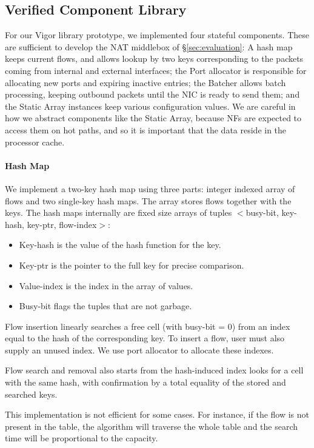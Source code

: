 \documentclass[letterpaper,twocolumn,10pt]{article}
\begin{document}
\subsection{Verified Component Library}

For our Vigor library prototype, we implemented four stateful components. These
are sufficient to develop the NAT middlebox of \S\ref{sec:evaluation}: A hash
map keeps current flows, and allows lookup by two keys corresponding to the
packets coming from internal and external interfaces; the Port allocator is
responsible for allocating new ports and expiring inactive entries; the Batcher
allows batch processing, keeping outbound packets until the NIC is ready to send
them; and the Static Array instances keep various configuration values. We are
careful in how we abstract components like the Static Array, because NFs are
expected to access them on hot paths, and so it is important that the data
reside in the processor cache.

\paragraph{Hash Map}

We implement a two-key hash map using three parts: integer indexed array of
flows and two single-key hash maps. The array stores flows together with the
keys. The hash maps internally are fixed size arrays of tuples $<$busy-bit,
key-hash, key-ptr, flow-index$>$:
\begin{itemize}
    \item Key-hash is the value of the hash function for the key.
    \item Key-ptr is the pointer to the full key for precise comparison.
    \item Value-index is the index in the array of values.
    \item Busy-bit flags the tuples that are not garbage.
\end{itemize}


Flow insertion linearly searches a free cell (with busy-bit = 0) from an index
equal to the hash of the corresponding key. To insert a flow, user must also
supply an unused index. We use port allocator to allocate these indexes.

Flow search and removal also starts from the hash-induced index looks for a cell
with the same hash, with confirmation by a total equality of the stored and
searched keys.

This implementation is not efficient for some cases. For instance, if the flow
is not present in the table, the algorithm will traverse the whole table and the
search time will be proportional to the capacity.
\end{document}
